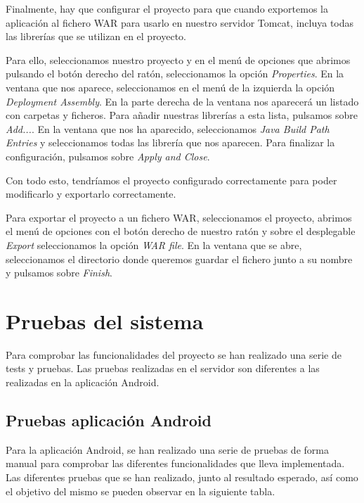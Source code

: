 
Finalmente, hay que configurar el proyecto para que cuando exportemos la aplicación al fichero WAR para usarlo en nuestro servidor Tomcat, incluya todas las librerías que se utilizan en el proyecto.

Para ello, seleccionamos nuestro proyecto y en el menú de opciones que abrimos pulsando el botón derecho del ratón, seleccionamos la opción \textit{Properties}. En la ventana que nos aparece, seleccionamos en el menú de la izquierda la opción \textit{Deployment Assembly}. En la parte derecha de la ventana nos aparecerá un listado con carpetas y ficheros. Para añadir nuestras librerías a esta lista, pulsamos sobre \textit{Add...}. En la ventana que nos ha aparecido, seleccionamos \textit{Java Build Path Entries} y seleccionamos todas las librería que nos aparecen. Para finalizar la configuración, pulsamos sobre \textit{Apply and Close}.


Con todo esto, tendríamos el proyecto configurado correctamente para poder modificarlo y exportarlo correctamente.

Para exportar el proyecto a un fichero WAR, seleccionamos el proyecto, abrimos el menú de opciones con el botón derecho de nuestro ratón y sobre el desplegable \textit{Export} seleccionamos la opción \textit{WAR file}. En la ventana que se abre, seleccionamos el directorio donde queremos guardar el fichero junto a su nombre y pulsamos sobre \textit{Finish}.



\section{Pruebas del sistema}

Para comprobar las funcionalidades del proyecto se han realizado una serie de tests y pruebas. Las pruebas realizadas en el servidor son diferentes a las realizadas en la aplicación Android.

\subsection{Pruebas aplicación Android}

Para la aplicación Android, se han realizado una serie de pruebas de forma manual para comprobar las diferentes funcionalidades que lleva implementada. Las diferentes pruebas que se han realizado, junto al resultado esperado, así como el objetivo del mismo se pueden observar en la siguiente tabla.

